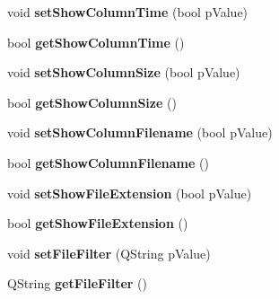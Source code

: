 \begin{DoxyCompactItemize}
\item 
\hypertarget{classQEFileBrowser_a1c52e72e607b33593ee2b6921be131e7}{
void {\bfseries setShowColumnTime} (bool pValue)}
\label{classQEFileBrowser_a1c52e72e607b33593ee2b6921be131e7}

\item 
\hypertarget{classQEFileBrowser_a5fd0c373bebfb94f1bbee8f30cad2eab}{
bool {\bfseries getShowColumnTime} ()}
\label{classQEFileBrowser_a5fd0c373bebfb94f1bbee8f30cad2eab}

\item 
\hypertarget{classQEFileBrowser_a0d79e96e5605a57c41b96126c57c93c8}{
void {\bfseries setShowColumnSize} (bool pValue)}
\label{classQEFileBrowser_a0d79e96e5605a57c41b96126c57c93c8}

\item 
\hypertarget{classQEFileBrowser_ade1a1eec9d9a7d89c2e1df8428b74938}{
bool {\bfseries getShowColumnSize} ()}
\label{classQEFileBrowser_ade1a1eec9d9a7d89c2e1df8428b74938}

\item 
\hypertarget{classQEFileBrowser_a1551f15ffbc19dc88b5485b1a564c4df}{
void {\bfseries setShowColumnFilename} (bool pValue)}
\label{classQEFileBrowser_a1551f15ffbc19dc88b5485b1a564c4df}

\item 
\hypertarget{classQEFileBrowser_add34d1939baec796dbaaed09cdf55e17}{
bool {\bfseries getShowColumnFilename} ()}
\label{classQEFileBrowser_add34d1939baec796dbaaed09cdf55e17}

\item 
\hypertarget{classQEFileBrowser_afe01ec859104709fdeaef83b0e86447d}{
void {\bfseries setShowFileExtension} (bool pValue)}
\label{classQEFileBrowser_afe01ec859104709fdeaef83b0e86447d}

\item 
\hypertarget{classQEFileBrowser_aa99b9932e15a1d165e685a45ebe7b49d}{
bool {\bfseries getShowFileExtension} ()}
\label{classQEFileBrowser_aa99b9932e15a1d165e685a45ebe7b49d}

\item 
\hypertarget{classQEFileBrowser_a467eeeb2fcf7f6bf1bf862d06e75112e}{
void {\bfseries setFileFilter} (QString pValue)}
\label{classQEFileBrowser_a467eeeb2fcf7f6bf1bf862d06e75112e}

\item 
\hypertarget{classQEFileBrowser_a0f72441784d078e261738c3fe3848c60}{
QString {\bfseries getFileFilter} ()}
\label{classQEFileBrowser_a0f72441784d078e261738c3fe3848c60}


\end{DoxyCompactItemize}
